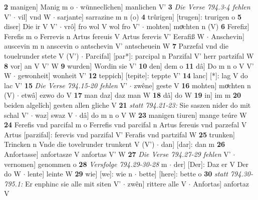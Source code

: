 \documentclass[8pt,a4paper,notitlepage]{article}
\begin{document}
\begin{table}[ht]
\begin{minipage}[t]{0.5\linewidth}
\textbf{2} manigen] Manig m o  $\cdot$ wünneclîchen] manlichen V' \textbf{3} \textit{Die Verse 794.3-4 fehlen} V'   $\cdot$ vil] vnd W  $\cdot$ sarjante] sarrazine m n (o) \textbf{4} trûrigen] [trugen]: trurigen o \textbf{5} diser] Die ir V V'  $\cdot$ vrô] fro wol V wol fro V'  $\cdot$ mohten] moͯchten n (V) \textbf{6} Ferefiz] Ferefis m o Ferrevis n Artus fereuis V Artus ferevis V' Eerafiß W  $\cdot$ Anschevin] auscevin m n anscevin o antschevin V' antscheuein W \textbf{7} Parzefal vnd die touelrunder stete V (V')  $\cdot$ Parcifal] [par*]: parcipal n Parzifal V' herr partzifal W \textbf{8} vor] an V V' W \textbf{9} wurden] Wordin sie V' \textbf{10} den] dem o \textbf{11} dâ] Do m n o V V' W  $\cdot$ gewonheit] wonheit V' \textbf{12} teppich] [tepite]: teppte V' \textbf{14} lanc] [*]: lag V do lac V' \textbf{15} \textit{Die Verse 794.15-20 fehlen} V'   $\cdot$ zwêne] geste V \textbf{16} mohten] moͯchten n (V)  $\cdot$ etwâ] ezwo do V \textbf{17} man daz] daz man W \textbf{18} dâ] do W \textbf{19} in] im m \textbf{20} beiden algelîch] gesten allen gliche V \textbf{21} \textit{statt 794.21-23:} Sie saszen nider do mit schal V'   $\cdot$ waz] swaz V  $\cdot$ dâ] do m n o V W \textbf{23} manigen tiuren] mange teúre W \textbf{24} Ferefis vnd parcifal m o Ferrefis vnd parcifal n Artus fereuis vnd parzefal V Artus [parzifal]: ferevis vnd parzifal V' Ferafis vnd partzifal W \textbf{25} trunken] Trincken n Vnde die tovelrunder trunkent V (V')  $\cdot$ dan] [dar]: dan m \textbf{26} Anfortasse] anfortasze V anfortas V' W \textbf{27} \textit{Die Verse 794.27-29 fehlen} V'   $\cdot$ vernomen] genommen o \textbf{28} \textit{Versfolge 794.29-30-28} m   $\cdot$ der] [Der]: Daz er V Der do W  $\cdot$ lente] leinte W \textbf{29} wie] [we]: wie n  $\cdot$ bette] [here]: bette o \textbf{30} \textit{statt 794.30-795.1:} Er enphinc sie alle mit siten V'   $\cdot$ zwên] rittere alle V  $\cdot$ Anfortas] anfortaz V \newline
\end{minipage}
\end{table}
\newpage
\end{document}
